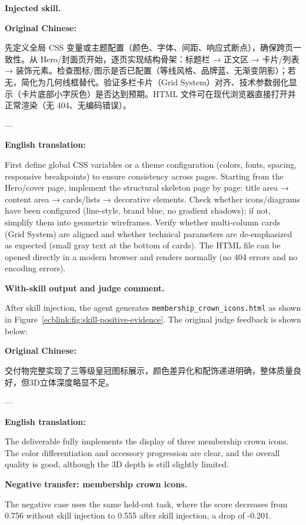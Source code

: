 \documentclass{llmxive}
\providecommand{\inlinett}[1]{{\footnotesize\texttt{#1}}}
\providecommand{\caseheader}[1]{\noindent\colorbox{fbcaseblue}{\parbox{0.96\linewidth}{\bfseries #1}}\vspace{0.5mm}\newline}
\begin{document}
\caseheader{Injected skill.}
\begin{casebox}\scriptsize
\textbf{Original Chinese:}

先定义全局 CSS 变量或主题配置（颜色、字体、间距、响应式断点），确保跨页一致性。从 Hero/封面页开始，逐页实现结构骨架：标题栏 → 正文区 → 卡片/列表 → 装饰元素。检查图标/图示是否已配置（等线风格、品牌蓝、无渐变阴影）；若无，简化为几何线框替代。验证多栏卡片（Grid System）对齐、技术参数弱化显示（卡片底部小字灰色）是否达到预期。HTML 文件可在现代浏览器直接打开并正常渲染（无 404、无编码错误）。

---

\textbf{English translation:}

First define global CSS variables or a theme configuration (colors, fonts, spacing, responsive breakpoints) to ensure consistency across pages. Starting from the Hero/cover page, implement the structural skeleton page by page: title area → content area → cards/lists → decorative elements. Check whether icons/diagrams have been configured (line-style, brand blue, no gradient shadows); if not, simplify them into geometric wireframes. Verify whether multi-column cards (Grid System) are aligned and whether technical parameters are de-emphasized as expected (small gray text at the bottom of cards). The HTML file can be opened directly in a modern browser and renders normally (no 404 errors and no encoding errors).
\end{casebox}

\caseheader{With-skill output and judge comment.}
After skill injection, the agent generates \inlinett{membership\_crown\_icons.html} as shown in Figure~\ref{ecblink:fig:skill-positive-evidence}. The original judge feedback is shown below:
\begin{casebox}\scriptsize
\textbf{Original Chinese:}

交付物完整实现了三等级皇冠图标展示，颜色差异化和配饰递进明确，整体质量良好，但3D立体深度略显不足。

---

\textbf{English translation:}

The deliverable fully implements the display of three membership crown icons. The color differentiation and accessory progression are clear, and the overall quality is good, although the 3D depth is still slightly limited.
\end{casebox}

\caseheader{Negative transfer: membership crown icons.}
The negative case uses the same held-out task, where the score decreases from 0.756 without skill injection to 0.555 after skill injection, a drop of -0.201.
\end{document}
